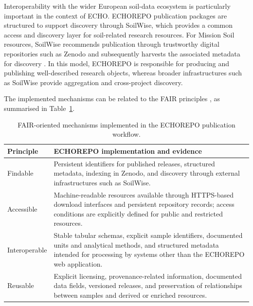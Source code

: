 Interoperability with the wider European soil-data ecosystem is particularly
important in the context of ECHO. ECHOREPO publication packages are structured
to support discovery through SoilWise, which provides a common access and
discovery layer for soil-related research resources. For Mission Soil
resources, SoilWise recommends publication through trustworthy digital
repositories such as Zenodo and subsequently harvests the associated metadata
for discovery \parencite{soilwise2026faq}. In this model, ECHOREPO is
responsible for producing and publishing well-described research objects,
whereas broader infrastructures such as SoilWise provide aggregation and
cross-project discovery.

The implemented mechanisms can be related to the FAIR principles
\parencite{wilkinson2016fair}, as summarised in
Table~\ref{tab:fair-evidence}.

\begin{table}[htbp]
    \centering
    \caption{FAIR-oriented mechanisms implemented in the ECHOREPO publication
    workflow.}
    \label{tab:fair-evidence}
    \begin{tabular}{p{} p{}}
        \toprule
        Principle & ECHOREPO implementation and evidence \\
        \midrule

        Findable &
        Persistent identifiers for published releases, structured metadata,
        indexing in Zenodo, and discovery through external infrastructures
        such as SoilWise. \\

        Accessible &
        Machine-readable resources available through HTTPS-based download
        interfaces and persistent repository records; access conditions are
        explicitly defined for public and restricted resources. \\

        Interoperable &
        Stable tabular schemas, explicit sample identifiers, documented units
        and analytical methods, and structured metadata intended for processing
        by systems other than the ECHOREPO web application. \\

        Reusable &
        Explicit licensing, provenance-related information, documented data
        fields, versioned releases, and preservation of relationships between
        samples and derived or enriched resources. \\

        \bottomrule
    \end{tabular}
\end{table}

